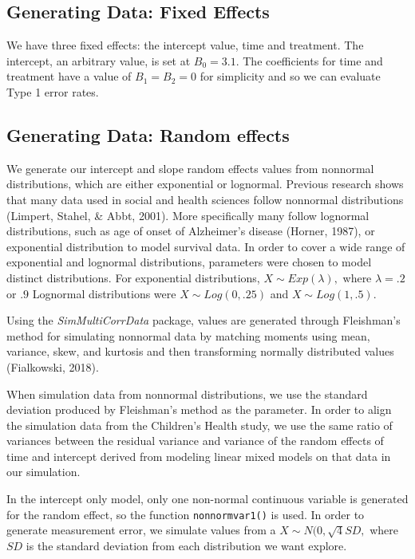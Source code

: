 \documentclass[12pt, twoside]{amherstthesis}
\begin{document}
\hypertarget{generating-data-fixed-effects}{%
\subsection{Generating Data: Fixed Effects}\label{generating-data-fixed-effects}}

We have three fixed effects: the intercept value, time and treatment. The intercept, an arbitrary value, is set at \(B_0 = 3.1\). The coefficients for time and treatment have a value of \(B_1 = B_2 = 0\) for simplicity and so we can evaluate Type 1 error rates.

\hypertarget{generating-data-random-effects}{%
\subsection{Generating Data: Random effects}\label{generating-data-random-effects}}

We generate our intercept and slope random effects values from nonnormal distributions, which are either exponential or lognormal. Previous research shows that many data used in social and health sciences follow nonnormal distributions (Limpert, Stahel, \& Abbt, 2001). More specifically many follow lognormal distributions, such as age of onset of Alzheimer's disease (Horner, 1987), or exponential distribution to model survival data. In order to cover a wide range of exponential and lognormal distributions, parameters were chosen to model distinct distributions. For exponential distributions, \(X\sim\mathit{Exp}(\lambda),\) where \(\lambda = .2\) or \(.9\) Lognormal distributions were \(X\sim\mathit{Log}(0,.25)\) and \(X\sim\mathit{Log}(1,.5).\)

Using the \emph{SimMultiCorrData} package, values are generated through Fleishman's method for simulating nonnormal data by matching moments using mean, variance, skew, and kurtosis and then transforming normally distributed values (Fialkowski, 2018).

When simulation data from nonnormal distributions, we use the standard deviation produced by Fleishman's method as the parameter. In order to align the simulation data from the Children's Health study, we use the same ratio of variances between the residual variance and variance of the random effects of time and intercept derived from modeling linear mixed models on that data in our simulation.

In the intercept only model, only one non-normal continuous variable is generated for the random effect, so the function \texttt{nonnormvar1()} is used. In order to generate measurement error, we simulate values from a \(X\sim\mathit{N}(0,\sqrt{4}SD,\) where \(SD\) is the standard deviation from each distribution we want explore.
\end{document}
